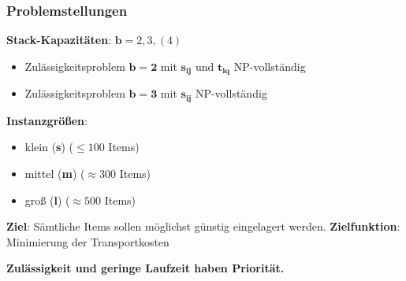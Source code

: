 \documentclass{beamer}
\begin{document}
\begin{frame}
\frametitle{Problemstellungen}

\textbf{Stack-Kapazitäten}: $\boldsymbol{b} = 2, 3, (4)$
\begin{itemize}
  \item Zulässigkeitsproblem $\boldsymbol{b=2}$ mit $\boldsymbol{s_{ij}}$ und $\boldsymbol{t_{iq}}$ NP-vollständig
  \item Zulässigkeitsproblem $\boldsymbol{b=3}$ mit $\boldsymbol{s_{ij}}$ NP-vollständig
\end{itemize}

\textbf{Instanzgrößen}:
\begin{itemize}
  \item klein (\textbf{s}) ($\leq 100$ Items)
  \item mittel (\textbf{m}) ($\approx 300$ Items)
  \item groß (\textbf{l}) ($\approx 500$ Items)\newline
\end{itemize}

\textbf{Ziel}: Sämtliche Items sollen möglichst günstig eingelagert werden.\newline
\textbf{Zielfunktion}: Minimierung der Transportkosten\newline

\textbf{Zulässigkeit und geringe Laufzeit haben Priorität.}\newline
\end{frame}


\end{document}

